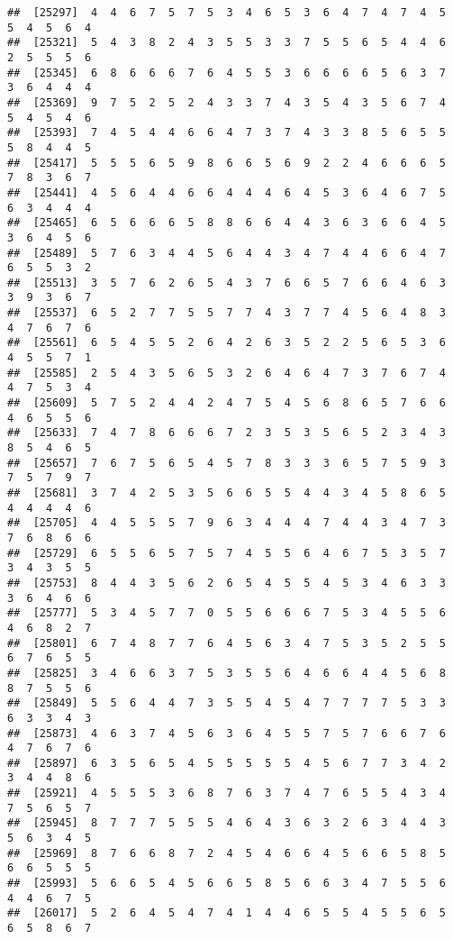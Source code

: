 \documentclass[
]{book}
\begin{document}
\begin{verbatim}
##  [25297]  4  4  6  7  5  7  5  3  4  6  5  3  6  4  7  4  7  4  5  5  4  5  6  4
##  [25321]  5  4  3  8  2  4  3  5  5  3  3  7  5  5  6  5  4  4  6  2  5  5  5  6
##  [25345]  6  8  6  6  6  7  6  4  5  5  3  6  6  6  6  5  6  3  7  3  6  4  4  4
##  [25369]  9  7  5  2  5  2  4  3  3  7  4  3  5  4  3  5  6  7  4  5  4  5  4  6
##  [25393]  7  4  5  4  4  6  6  4  7  3  7  4  3  3  8  5  6  5  5  5  8  4  4  5
##  [25417]  5  5  5  6  5  9  8  6  6  5  6  9  2  2  4  6  6  6  5  7  8  3  6  7
##  [25441]  4  5  6  4  4  6  6  4  4  4  6  4  5  3  6  4  6  7  5  6  3  4  4  4
##  [25465]  6  5  6  6  6  5  8  8  6  6  4  4  3  6  3  6  6  4  5  3  6  4  5  6
##  [25489]  5  7  6  3  4  4  5  6  4  4  3  4  7  4  4  6  6  4  7  6  5  5  3  2
##  [25513]  3  5  7  6  2  6  5  4  3  7  6  6  5  7  6  6  4  6  3  3  9  3  6  7
##  [25537]  6  5  2  7  7  5  5  7  7  4  3  7  7  4  5  6  4  8  3  4  7  6  7  6
##  [25561]  6  5  4  5  5  2  6  4  2  6  3  5  2  2  5  6  5  3  6  4  5  5  7  1
##  [25585]  2  5  4  3  5  6  5  3  2  6  4  6  4  7  3  7  6  7  4  4  7  5  3  4
##  [25609]  5  7  5  2  4  4  2  4  7  5  4  5  6  8  6  5  7  6  6  4  6  5  5  6
##  [25633]  7  4  7  8  6  6  6  7  2  3  5  3  5  6  5  2  3  4  3  8  5  4  6  5
##  [25657]  7  6  7  5  6  5  4  5  7  8  3  3  3  6  5  7  5  9  3  7  5  7  9  7
##  [25681]  3  7  4  2  5  3  5  6  6  5  5  4  4  3  4  5  8  6  5  4  4  4  4  6
##  [25705]  4  4  5  5  5  7  9  6  3  4  4  4  7  4  4  3  4  7  3  7  6  8  6  6
##  [25729]  6  5  5  6  5  7  5  7  4  5  5  6  4  6  7  5  3  5  7  3  4  3  5  5
##  [25753]  8  4  4  3  5  6  2  6  5  4  5  5  4  5  3  4  6  3  3  3  6  4  6  6
##  [25777]  5  3  4  5  7  7  0  5  5  6  6  6  7  5  3  4  5  5  6  4  6  8  2  7
##  [25801]  6  7  4  8  7  7  6  4  5  6  3  4  7  5  3  5  2  5  5  6  7  6  5  5
##  [25825]  3  4  6  6  3  7  5  3  5  5  6  4  6  6  4  4  5  6  8  8  7  5  5  6
##  [25849]  5  5  6  4  4  7  3  5  5  4  5  4  7  7  7  7  5  3  3  6  3  3  4  3
##  [25873]  4  6  3  7  4  5  6  3  6  4  5  5  7  5  7  6  6  7  6  4  7  6  7  6
##  [25897]  6  3  5  6  5  4  5  5  5  5  5  4  5  6  7  7  3  4  2  3  4  4  8  6
##  [25921]  4  5  5  5  3  6  8  7  6  3  7  4  7  6  5  5  4  3  4  7  5  6  5  7
##  [25945]  8  7  7  7  5  5  5  4  6  4  3  6  3  2  6  3  4  4  3  5  6  3  4  5
##  [25969]  8  7  6  6  8  7  2  4  5  4  6  6  4  5  6  6  5  8  5  6  6  5  5  5
##  [25993]  5  6  6  5  4  5  6  6  5  8  5  6  6  3  4  7  5  5  6  4  4  6  7  5
##  [26017]  5  2  6  4  5  4  7  4  1  4  4  6  5  5  4  5  5  6  5  6  5  8  6  7

\end{verbatim}
\end{document}
